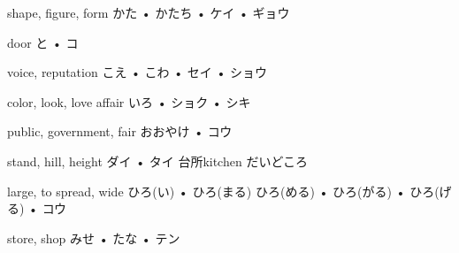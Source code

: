 



\setcounter{cardnum}{97}

		{shape, figure, form}
		{かた • かたち • ケイ • ギョウ}
		{}{}
		{}{}
		{}{}
		{}{}
		{}{}

		{door}
		{と • コ}
		{}{}
		{}{}
		{}{}
		{}{}
		{}{}

		{voice, reputation}
		{こえ • こわ • セイ • ショウ}
		{}{}
		{}{}
		{}{}
		{}{}
		{}{}

		{color, look, love affair}
		{いろ • ショク • シキ}
		{}{}
		{}{}
		{}{}
		{}{}
		{}{}

		{public, government, fair }
		{おおやけ • コウ}
		{}{}
		{}{}
		{}{}
		{}{}
		{}{}

		{stand, hill, height}
		{ダイ • タイ}
		{台所}{kitchen だいどころ}
		{}{}
		{}{}
		{}{}
		{}{}

		{large, to spread, wide}
		{ひろ(い) • ひろ(まる) ひろ(める) • ひろ(がる) • ひろ(げる) • コウ}
		{}{}
		{}{}
		{}{}
		{}{}
		{}{}

		{store, shop}
		{みせ • たな • テン}
		{}{}
		{}{}
		{}{}
		{}{}
		{}{}

